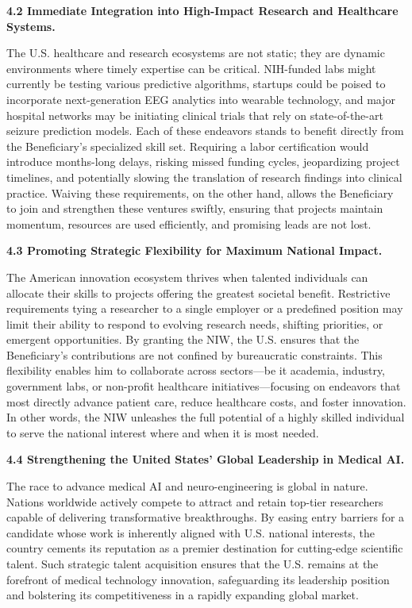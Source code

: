 \documentclass{article}
\begin{document}
{\bf 4.2 Immediate Integration into High-Impact Research and Healthcare Systems.}

The U.S. healthcare and research ecosystems are not static; they are dynamic environments where timely expertise can be critical. NIH-funded labs might currently be testing various predictive algorithms, startups could be poised to incorporate next-generation EEG analytics into wearable technology, and major hospital networks may be initiating clinical trials that rely on state-of-the-art seizure prediction models. Each of these endeavors stands to benefit directly from the Beneficiary’s specialized skill set. Requiring a labor certification would introduce months-long delays, risking missed funding cycles, jeopardizing project timelines, and potentially slowing the translation of research findings into clinical practice. Waiving these requirements, on the other hand, allows the Beneficiary to join and strengthen these ventures swiftly, ensuring that projects maintain momentum, resources are used efficiently, and promising leads are not lost.

{\bf 4.3 Promoting Strategic Flexibility for Maximum National Impact.}

The American innovation ecosystem thrives when talented individuals can allocate their skills to projects offering the greatest societal benefit. Restrictive requirements tying a researcher to a single employer or a predefined position may limit their ability to respond to evolving research needs, shifting priorities, or emergent opportunities. By granting the NIW, the U.S. ensures that the Beneficiary’s contributions are not confined by bureaucratic constraints. This flexibility enables him to collaborate across sectors—be it academia, industry, government labs, or non-profit healthcare initiatives—focusing on endeavors that most directly advance patient care, reduce healthcare costs, and foster innovation. In other words, the NIW unleashes the full potential of a highly skilled individual to serve the national interest where and when it is most needed.


{\bf 4.4 Strengthening the United States’ Global Leadership in Medical AI.}

The race to advance medical AI and neuro-engineering is global in nature. Nations worldwide actively compete to attract and retain top-tier researchers capable of delivering transformative breakthroughs. By easing entry barriers for a candidate whose work is inherently aligned with U.S. national interests, the country cements its reputation as a premier destination for cutting-edge scientific talent. Such strategic talent acquisition ensures that the U.S. remains at the forefront of medical technology innovation, safeguarding its leadership position and bolstering its competitiveness in a rapidly expanding global market.
\end{document}

